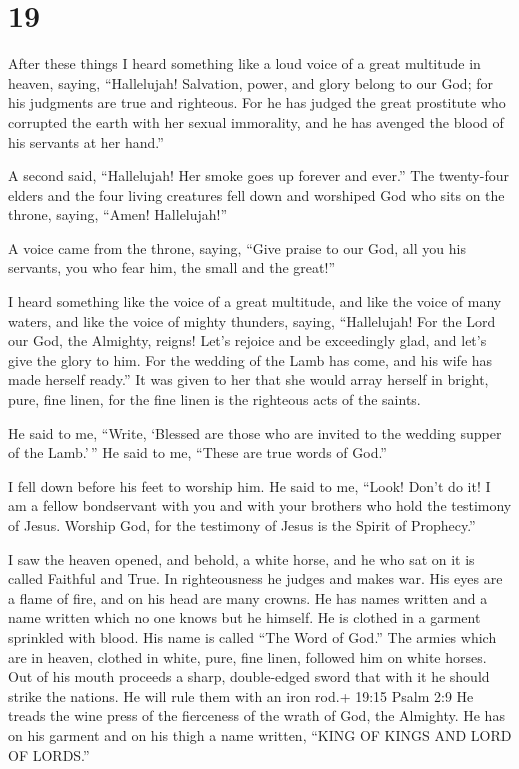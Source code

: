 \hypertarget{section-18}{%
\section{19}\label{section-18}}

 After these things I heard something like a loud voice of a
great multitude in heaven, saying, ``Hallelujah! Salvation, power, and
glory belong to our God;  for his judgments are true and
righteous. For he has judged the great prostitute who corrupted the
earth with her sexual immorality, and he has avenged the blood of his
servants at her hand.''

 A second said, ``Hallelujah! Her smoke goes up forever and
ever.''  The twenty-four elders and the four living
creatures fell down and worshiped God who sits on the throne, saying,
``Amen! Hallelujah!''

 A voice came from the throne, saying, ``Give praise to our
God, all you his servants, you who fear him, the small and the great!''

 I heard something like the voice of a great multitude, and
like the voice of many waters, and like the voice of mighty thunders,
saying, ``Hallelujah! For the Lord our God, the Almighty, reigns!
 Let's rejoice and be exceedingly glad, and let's give the
glory to him. For the wedding of the Lamb has come, and his wife has
made herself ready.''  It was given to her that she would
array herself in bright, pure, fine linen, for the fine linen is the
righteous acts of the saints.

 He said to me, ``Write, `Blessed are those who are invited
to the wedding supper of the Lamb.'\,'' He said to me, ``These are true
words of God.''

 I fell down before his feet to worship him. He said to me,
``Look! Don't do it! I am a fellow bondservant with you and with your
brothers who hold the testimony of Jesus. Worship God, for the testimony
of Jesus is the Spirit of Prophecy.''

 I saw the heaven opened, and behold, a white horse, and he
who sat on it is called Faithful and True. In righteousness he judges
and makes war.  His eyes are a flame of fire, and on his
head are many crowns. He has names written and a name written which no
one knows but he himself.  He is clothed in a garment
sprinkled with blood. His name is called ``The Word of God.''
 The armies which are in heaven, clothed in white, pure,
fine linen, followed him on white horses.  Out of his mouth
proceeds a sharp, double-edged sword that with it he should strike the
nations. He will rule them with an iron rod.+ 19:15 Psalm 2:9 He treads
the wine press of the fierceness of the wrath of God, the Almighty.
 He has on his garment and on his thigh a name written,
``KING OF KINGS AND LORD OF LORDS.''

